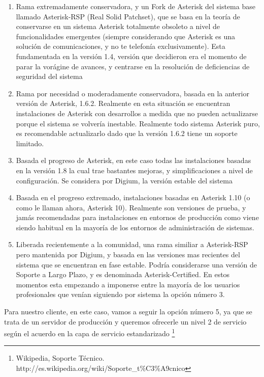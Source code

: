 \begin{enumerate}

\item Rama extremadamente conservadora, y un Fork de Asterisk del sistema base llamado Asterisk-RSP (Real Solid Patchset), que se basa en la teoría de conservarse en un sistema Asterisk totalmente obsoleto a nivel de funcionalidades emergentes (siempre considerando que Asterisk es una solución de comunicaciones, y no te telefonía exclusivamente). Esta fundamentada en la versión 1.4, versión que decidieron era el momento de parar la vorágine de avances, y centrarse en la resolución de deficiencias de seguridad del sistema
\item Rama por necesidad o moderadamente conservadora, basada en la anterior versión de Asterisk, 1.6.2. Realmente en esta situación se encuentran instalaciones de Asterisk con desarrollos a medida que no pueden actualizarse porque el sistema se volvería inestable. Realmente todo sistema Asterisk puro, es recomendable actualizarlo dado que la versión 1.6.2 tiene un soporte limitado.
\item Basada el progreso de Asterisk, en este caso todas las instalaciones basadas en la versión 1.8 la cual trae bastantes mejoras, y simplificaciones a nivel de configuración. Se considera por Digium, la versión estable del sistema
\item Basada en el progreso extremado, instalaciones basadas en Asterisk 1.10 (o como le llaman ahora, Asterisk 10). Realmente son versiones de prueba, y jamás recomendadas para instalaciones en entornos de producción como viene siendo habitual en la mayoría de los entornos de administración de sistemas.
\item Liberada recientemente a la comunidad, una rama similiar a Asterisk-RSP pero mantenida por Digium, y basada en las versiones mas recientes del sistema que se encuentran en fase estable. Podría considerarse una versión de Soporte a Largo Plazo, y es denominada Asterisk-Certified. En estos momentos esta empezando a imponerse entre la mayoría de los usuarios profesionales que venían siguiendo por sistema la opción número 3.

\end{enumerate}

Para nuestro cliente, en este caso, vamos a seguir la opción número 5, ya que se trata de un servidor de producción y queremos ofrecerle un nivel 2 de servicio según el acuerdo en la capa de servicio estandarizado \footnote{Wikipedia, Soporte Técnico. http://es.wikipedia.org/wiki/Soporte\_t\%C3\%A9cnico} \cite{walker01}

